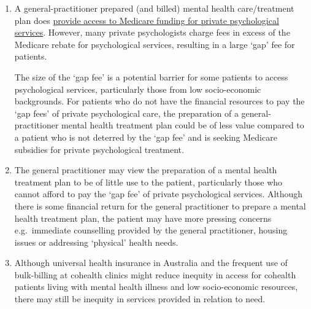\documentclass[
  letterpaper,
  DIV=11,
  numbers=noendperiod,
  oneside]{scrartcl}
\begin{document}
\begin{enumerate}
  other funding sources.
\item
  A general-practitioner prepared (and billed) mental health
  care/treatment plan does
  \href{https://www.servicesaustralia.gov.au/mental-health-care-and-medicare?context=60092}{provide
  access to Medicare funding for private psychological services}.
  However, many private psychologists charge fees in excess of the
  Medicare rebate for psychological services, resulting in a large `gap'
  fee for patients.

  The size of the `gap fee' is a potential barrier for some patients to
  access psychological services, particularly those from low
  socio-economic backgrounds. For patients who do not have the financial
  resources to pay the `gap fees' of private psychological care, the
  preparation of a general-practitioner mental health treatment plan
  could be of less value compared to a patient who is not deterred by
  the `gap fee' and is seeking Medicare subsidies for private
  psychological treatment.
\item
  The general practitioner may view the preparation of a mental health
  treatment plan to be of little use to the patient, particularly those
  who cannot afford to pay the `gap fee' of private psychological
  services. Although there is some financial return for the general
  practitioner to prepare a mental health treatment plan, the patient
  may have more pressing concerns e.g.~immediate counselling provided by
  the general practitioner, housing issues or addressing `physical'
  health needs.
\item
  Although universal health insurance in Australia and the frequent use
  of bulk-billing at cohealth clinics might reduce inequity in
  access for
  cohealth patients living with mental health illness and low
  socio-economic resources, there may still be inequity in services
  provided in relation to need.
\end{enumerate}
\end{document}

